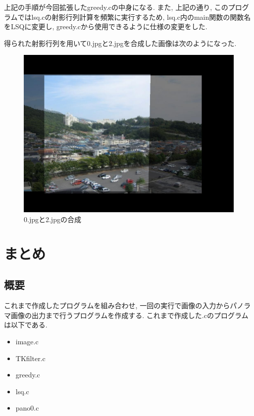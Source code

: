 \documentclass[a4j]{jarticle}
\begin{document}
上記の手順が今回拡張したgreedy.cの中身になる.
また, 上記の通り, このプログラムではlsq.cの射影行列計算を頻繁に実行するため, lsq.c内のmain関数の関数名をLSQに変更し, greedy.cから使用できるように仕様の変更をした. 

得られた射影行列を用いて0.jpgと2.jpgを合成した画像は次のようになった.


\begin{figure}[h]
\begin{center}
\includegraphics[bb=0 0 1024 768,scale=.3]{../7/out.jpg}
\caption{0.jpgと2.jpgの合成}
\end{center}
\end{figure}


\section{まとめ}

\subsection{概要}

これまで作成したプログラムを組み合わせ, 一回の実行で画像の入力からパノラマ画像の出力まで行うプログラムを作成する. 
これまで作成した.cのプログラムは以下である.
\begin{itemize}
\item image.c
\item TKfilter.c
\item greedy.c
\item lsq.c
\item pano0.c
\end{itemize}
\end{document}
